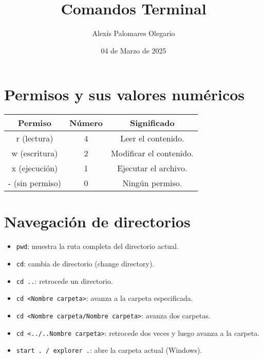 \documentclass{article}
\title{Comandos Terminal}
\author{Alexis Palomares Olegario}
\date{04 de Marzo de 2025}
\begin{document}
\maketitle

\section{Permisos y sus valores numéricos}
\begin{center}
\begin{tabular}{|c|c|c|}
\hline
\textbf{Permiso} & \textbf{Número} & \textbf{Significado} \\
\hline
r (lectura) & 4 & Leer el contenido. \\
w (escritura) & 2 & Modificar el contenido. \\
x (ejecución) & 1 & Ejecutar el archivo. \\
- (sin permiso) & 0 & Ningún permiso. \\
\hline
\end{tabular}
\end{center}

\section{Navegación de directorios}
\begin{itemize}
    \item \texttt{pwd}: muestra la ruta completa del directorio actual.
    \item \texttt{cd}: cambia de directorio (change directory).
    \item \texttt{cd ..}: retrocede un directorio.
    \item \texttt{cd <Nombre carpeta>}: avanza a la carpeta especificada.
    \item \texttt{cd <Nombre carpeta/Nombre carpeta>}: avanza dos carpetas.
    \item \texttt{cd <../..Nombre carpeta>}: retrocede dos veces y luego avanza a la carpeta.
    \item \texttt{start . / explorer .}: abre la carpeta actual (Windows).
\end{itemize}
\end{document}
